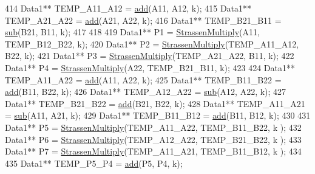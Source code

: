 \begin{DoxyCode}
414                                 Data1** TEMP\_A11\_A12 = \hyperlink{classMATOPS_1_1BigMatrix_a175eecea05e419357d7475f5e3e938da}{add}(A11, A12, k);
415                                 Data1** TEMP\_A21\_A22 = \hyperlink{classMATOPS_1_1BigMatrix_a175eecea05e419357d7475f5e3e938da}{add}(A21, A22, k);
416                                 Data1** TEMP\_B21\_B11 = \hyperlink{classMATOPS_1_1BigMatrix_a5c89e7f360fb3cc32abbf6f1d430fb1f}{sub}(B21, B11, k);
417 
418 
419                                 Data1** P1 = \hyperlink{classMATOPS_1_1BigMatrix_a71c665c80a1ca3731bd0d8ce37f0ace1}{StrassenMultiply}(A11, TEMP\_B12\_B22, k);
420                                 Data1** P2 = \hyperlink{classMATOPS_1_1BigMatrix_a71c665c80a1ca3731bd0d8ce37f0ace1}{StrassenMultiply}(TEMP\_A11\_A12, B22, k);
421                                 Data1** P3 = \hyperlink{classMATOPS_1_1BigMatrix_a71c665c80a1ca3731bd0d8ce37f0ace1}{StrassenMultiply}(TEMP\_A21\_A22, B11, k);
422                                 Data1** P4 = \hyperlink{classMATOPS_1_1BigMatrix_a71c665c80a1ca3731bd0d8ce37f0ace1}{StrassenMultiply}(A22, TEMP\_B21\_B11, k);
423 
424                                 Data1** TEMP\_A11\_A22 = \hyperlink{classMATOPS_1_1BigMatrix_a175eecea05e419357d7475f5e3e938da}{add}(A11, A22, k);
425                                 Data1** TEMP\_B11\_B22 = \hyperlink{classMATOPS_1_1BigMatrix_a175eecea05e419357d7475f5e3e938da}{add}(B11, B22, k);
426                                 Data1** TEMP\_A12\_A22 = \hyperlink{classMATOPS_1_1BigMatrix_a5c89e7f360fb3cc32abbf6f1d430fb1f}{sub}(A12, A22, k);
427                                 Data1** TEMP\_B21\_B22 = \hyperlink{classMATOPS_1_1BigMatrix_a175eecea05e419357d7475f5e3e938da}{add}(B21, B22, k);
428                                 Data1** TEMP\_A11\_A21 = \hyperlink{classMATOPS_1_1BigMatrix_a5c89e7f360fb3cc32abbf6f1d430fb1f}{sub}(A11, A21, k);
429                                 Data1** TEMP\_B11\_B12 = \hyperlink{classMATOPS_1_1BigMatrix_a175eecea05e419357d7475f5e3e938da}{add}(B11, B12, k);
430 
431                                 Data1** P5 = \hyperlink{classMATOPS_1_1BigMatrix_a71c665c80a1ca3731bd0d8ce37f0ace1}{StrassenMultiply}(TEMP\_A11\_A22, TEMP\_B11\_B22, k
      );
432                                 Data1** P6 = \hyperlink{classMATOPS_1_1BigMatrix_a71c665c80a1ca3731bd0d8ce37f0ace1}{StrassenMultiply}(TEMP\_A12\_A22, TEMP\_B21\_B22, k
      );
433                                 Data1** P7 = \hyperlink{classMATOPS_1_1BigMatrix_a71c665c80a1ca3731bd0d8ce37f0ace1}{StrassenMultiply}(TEMP\_A11\_A21, TEMP\_B11\_B12, k
      );
434 
435                                 Data1** TEMP\_P5\_P4 = \hyperlink{classMATOPS_1_1BigMatrix_a175eecea05e419357d7475f5e3e938da}{add}(P5, P4, k);

\end{DoxyCode}
